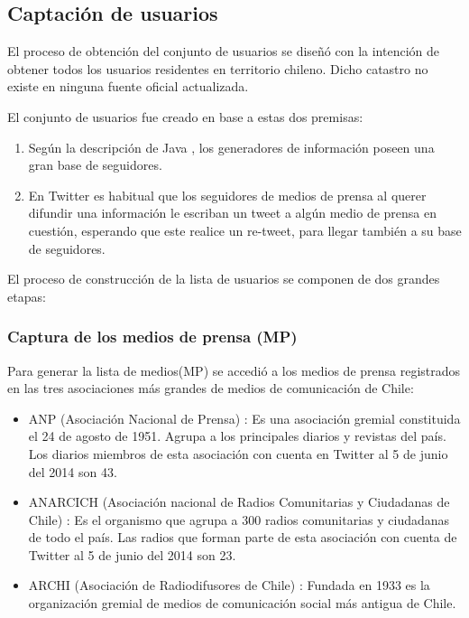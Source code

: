 \newpage
\subsection{Captación de usuarios}

El proceso de obtención del conjunto de usuarios se diseñó con la intención de obtener todos los usuarios residentes en territorio chileno. Dicho catastro no existe en ninguna fuente oficial actualizada.

El conjunto de usuarios fue creado en base a estas dos premisas:
\begin{enumerate}
	\item Según la descripción de Java \cite{JavaEtAl:07}, los generadores de información poseen una gran base de seguidores.
	\item En Twitter es habitual que los seguidores de medios de prensa al querer difundir una información le escriban un tweet a algún medio de prensa en cuestión, esperando que este realice un re-tweet, para llegar también a su base de seguidores.
\end{enumerate}

El proceso de construcción de la lista de usuarios se componen de dos grandes etapas:



\subsubsection{Captura de los medios de prensa (MP)}

Para generar la lista de medios(MP) se accedió a los medios de prensa registrados en las tres asociaciones más grandes de medios de comunicación de Chile:
\begin{itemize}
	\item ANP (Asociación Nacional de Prensa) \cite{anpWebsite}: Es una asociación gremial constituida el 24 de agosto de 1951. Agrupa a los principales diarios y revistas del país. Los diarios miembros de esta asociación con cuenta en Twitter al 5 de junio del 2014 son 43.
	\item ANARCICH (Asociación nacional de Radios Comunitarias y Ciudadanas de Chile) \cite{anarcichWebsite}: Es el organismo que agrupa a 300 radios comunitarias y ciudadanas de todo el país. Las radios que forman parte de esta asociación con cuenta de Twitter al 5 de junio del 2014 son 23.
	\item ARCHI (Asociación de Radiodifusores de Chile) \cite{archiWebsite}: Fundada en 1933 es la organización gremial de medios de comunicación social más antigua de Chile.
\end{itemize}	

